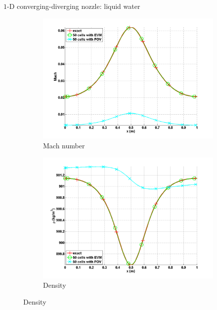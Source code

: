\documentclass[xcolor=dvipsnames,10pt]{beamer}
\begin{document}
\begin{frame}{$1$-D converging-diverging nozzle: liquid water}
\begin{figure}[H]
        \centering
        \begin{subfigure}[b]{0.37\textwidth}
                \centering
                \includegraphics[width=\textwidth]{../figures/liquid_mach_numerical_and_exact_50.png}
                \caption{Mach number}
        \end{subfigure}%
        \begin{subfigure}[b]{0.37\textwidth}
                \centering
                \includegraphics[width=\textwidth]{../figures/liquid_density_numerical_and_exact_50.png}
                \caption{Density}
        \end{subfigure}
        

\end{figure}
\end{frame}
\end{document}

